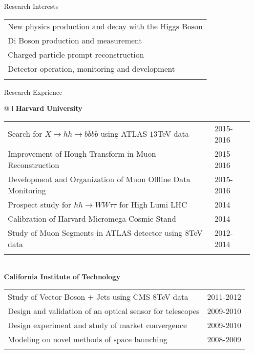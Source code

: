 \documentclass[letterpaper,11pt,oneside]{article}
\begin{document}
 \raggedright
 \Large{Research Interests} \\
 \normalsize
 \begin{flushleft}
\hspace{1cm}
 \begin{tabular}{@{} l}
     New physics production and decay with the Higgs Boson\\
     Di Boson production and measurement \\
     Charged particle prompt reconstruction \\
     Detector operation, monitoring and development\\
     \\
      \end{tabular}
\end{flushleft}

 \raggedright
 \Large{Research Exprience} \\
 \normalsize
\begin{flushleft}
\hspace{1cm}
 \begin{tabular}{@{} l}
    \textbf{Harvard University} \\ 
    \begin{tabular}{@{} l l }
 Search for $X \to hh \to b\bar{b}b\bar{b}$ using ATLAS $13$TeV data & 2015-2016\\
 Improvement of Hough Transform in Muon Reconstruction & 2015-2016\\
 Development and Organization of Muon Offline Data Monitoring & 2015-2016\\
 Prospect study for $hh \to WW\tau\tau$ for High Lumi LHC & 2014\\
 Calibration of Harvard Micromega Cosmic Stand & 2014\\
 Study of Muon Segments in ATLAS detector using $8$TeV data & 2012-2014\\
    \hspace{0.7\linewidth} & \hspace{0.1\linewidth} \\
     \end{tabular}
     \\
     \textbf{California Institute of Technology} \\
     \begin{tabular}{@{} l l }
 Study of Vector Boson + Jets using CMS $8$TeV data&2011-2012\\
 Design and validation of an optical sensor for telescopes&2009-2010\\
 Design experiment and study of market convergence &2009-2010\\
 Modeling on novel methods of space launching&2008-2009\\
    \hspace{0.7\linewidth} & \hspace{0.1\linewidth} \\
      \end{tabular}
      \end{tabular}
\end{flushleft}
\newpage
\end{document}
